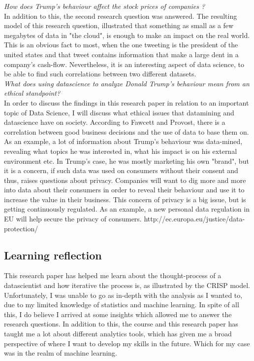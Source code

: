 \documentclass[12pt]{article}
\begin{document}
\textit{How does Trump's behaviour affect the stock prices of companies ?} \\
In addition to this, the second research question was answered. The resulting model of this research question, illustrated that something as small as a few megabytes of data in "the cloud", is enough to make an impact on the real world. This is an obvious fact to most, when the one tweeting is the president of the united states and that tweet contains information that make a large dent in a company's cash-flow.  Nevertheless, it is an interesting aspect of data science, to be able to find such correlations between two different datasets. \\

\textit{What does using datascience to analyze Donald Trump's behaviour mean from an ethical standpoint?}\\
 In order to discuss the findings in this research paper in relation to an important topic of Data Science, I will discuss what ethical issues that datamining and datascience have on society. According to Fawcett and Provost, there is a correlation between good business decisions and the use of data to base them on. As an example, a lot of information about Trump's behaviour was data-mined, revealing what topics he was interested in, what his impact is on his external environment etc. In Trump's case, he was mostly marketing his own "brand", but it is a concern, if such data was used on consumers without their consent and thus, raises questions about privacy. Companies will want to dig more and more into data about their consumers in order to reveal their behaviour and use it to increase the value in their business. This concern of privacy is a big issue, but is getting continuously regulated. As an example, a new personal data regulation in EU will help secure the privacy of consumers. http://ec.europa.eu/justice/data-protection/



\subsection{Learning reflection}
This research paper has helped me learn about the thought-process of a datascientist and how iterative the process is, as illustrated by the CRISP model. Unfortunately, I was unable to go as in-depth with the analysis as I wanted to, due to my limited knowledge of statistics and machine learning. In spite of all this, I do believe I arrived at some insights which allowed me to answer the research questions. In addition to this, the course and this research paper has taught me a lot about different analytics tools, which has given me a broad perspective of where I want to develop my skills in the future. Which for my case was in the realm of machine learning.
\end{document}
